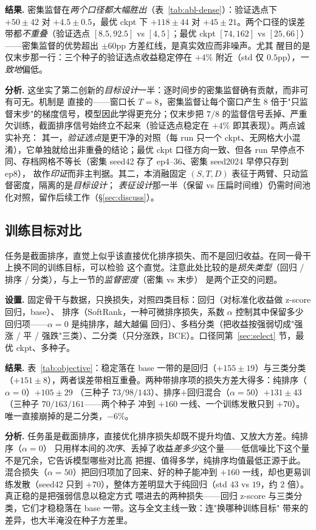 \documentclass[a4paper,11pt,fontset=fandol]{ctexart}
\begin{document}
\textbf{\heiti 结果.} 密集监督在\emph{两个口径都大幅胜出}（表~\ref{tab:abl-dense}）：验证选点下 $+50\pm42$ 对
$+4.5\pm0.5$，最优 ckpt 下 $+118\pm44$ 对 $+45\pm21$。两个口径的误差带都\emph{不重叠}（验证选点 $[8.5,92.5]$ vs
$[4,5]$；最优 ckpt $[74,162]$ vs $[25,66]$）——密集监督的优势超出 $\pm60$pp 方差红线，是真实效应而非噪声。尤其
醒目的是仅末步那一行：三个种子的验证选点收益稳定停在 $+4\%$ 附近（std 仅 $0.5$pp），\emph{一致地}偏低。

\textbf{\heiti 分析.} 这坐实了第二创新的\emph{目标设计}一半：逐时间步的密集监督确有贡献，而非可有可无。机制是
直接的——窗口长 $T{=}8$，密集监督让每个窗口产生 $8$ 倍于"只监督末步"的梯度信号，模型因此学得更充分；仅末步把
$7/8$ 的监督信号丢掉、严重欠训练，截面排序信号始终立不起来（验证选点稳定在 $+4\%$ 即其表现）。两点诚实补充：
其一，\emph{验证选点}是更干净的对照（每 run 只一个 ckpt、无网格大小混淆），它单独就给出非重叠的结论；最优 ckpt
口径方向一致、但各 run 早停点不同、存档网格不等长（密集 seed42 存了 ep4--36、密集 seed2024 早停只存到 ep8），
故作\emph{印证}而非主判据。其二，本消融固定 $(S,T,D)$ 表征于两臂、只动监督密度，隔离的是\emph{目标设计}；
\emph{表征设计}那一半（保留 vs 压扁时间维）仍需时间池化对照，留作后续工作（§\ref{sec:discuss}）。

\subsection{训练目标对比}\label{sec:objective}
任务是截面排序，直觉上似乎该直接优化排序损失、而不是回归收益。在同一骨干上换不同的训练目标，可以检验
这个直觉。注意此处比较的是\emph{损失类型}（回归 / 排序 / 分类），与上一节的\emph{监督密度}（密集 vs 末步）
是两个正交的问题。

\textbf{\heiti 设置.} 固定骨干与数据，只换损失，对照四类目标：回归（对标准化收益做 z-score 回归，base）、
排序（SoftRank，一种可微排序损失，系数 $\alpha$ 控制其中保留多少回归项——$\alpha{=}0$ 是纯排序，越大越偏
回归）、多档分类（把收益按强弱切成"强涨 / 平 / 强跌"三类）、二分类（只分涨跌，BCE）。口径同第~\ref{sec:select}
节，最优 ckpt、多种子。

\textbf{\heiti 结果.} 表~\ref{tab:objective}：稳定落在 base 一带的是回归（$+155\pm19$）与三类分类
（$+151\pm8$），两者误差带相互重叠。两种带排序项的损失方差大得多：纯排序（$\alpha{=}0$）$+105\pm29$
（三种子 $73 / 98 / 143$）、排序$+$回归混合（$\alpha{=}50$）$+131\pm43$（三种子 $70 / 163 / 161$——两个种子
冲到 $+160$ 一线、一个训练发散只到 $+70$）。唯一直接崩掉的是二分类，$-6\%$。

\textbf{\heiti 分析.} 任务虽是截面排序，直接优化排序损失却既不提升均值、又放大方差。纯排序（$\alpha{=}0$）
只用样本间的\emph{次序}、丢掉了收益\emph{差多少}这个量——低信噪比下这个量不是冗余，它告诉模型哪些对比高
把握、值得多学，纯排序均值最低正源于此。混合损失（$\alpha{=}50$）把回归项加了回来、好的种子能冲到 $+160$
一线，却也更易训练发散（seed42 只到 $+70$），整体方差明显大于纯回归（std $43$ vs $19$，约 $2$ 倍）。真正稳的是把强弱信息以稳定方式
喂进去的两种损失——回归 z-score 与三类分类，它们才稳稳落在 base 一带。这与全文主线一致：连"换哪种训练目标"
带来的差异，也大半淹没在种子方差里。
\end{document}
